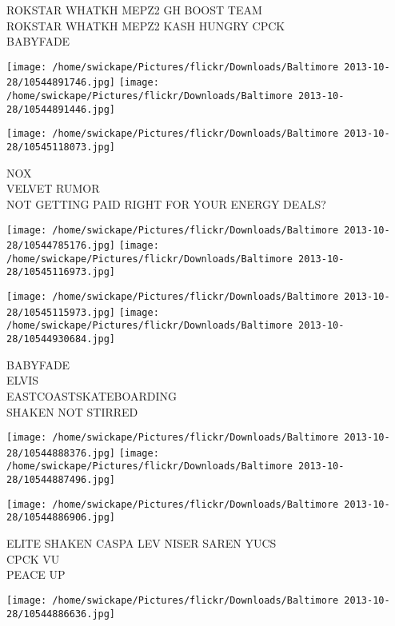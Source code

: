 \documentclass[10pt,letterpaper]{article}
\begin{document}
ROKSTAR WHATKH MEPZ2 GH BOOST TEAM\\
ROKSTAR WHATKH MEPZ2 KASH HUNGRY CPCK\\
BABYFADE\\
\pagebreak

\texttt{[image: /home/swickape/Pictures/flickr/Downloads/Baltimore 2013-10-28/10544891746.jpg]}
\texttt{[image: /home/swickape/Pictures/flickr/Downloads/Baltimore 2013-10-28/10544891446.jpg]}

\vspace{0.25in}
\texttt{[image: /home/swickape/Pictures/flickr/Downloads/Baltimore 2013-10-28/10545118073.jpg]}

NOX\\
VELVET RUMOR\\
NOT GETTING PAID RIGHT FOR YOUR ENERGY DEALS?\\
\pagebreak

\texttt{[image: /home/swickape/Pictures/flickr/Downloads/Baltimore 2013-10-28/10544785176.jpg]}
\texttt{[image: /home/swickape/Pictures/flickr/Downloads/Baltimore 2013-10-28/10545116973.jpg]}

\texttt{[image: /home/swickape/Pictures/flickr/Downloads/Baltimore 2013-10-28/10545115973.jpg]}
\texttt{[image: /home/swickape/Pictures/flickr/Downloads/Baltimore 2013-10-28/10544930684.jpg]}

BABYFADE\\
ELVIS\\
EASTCOASTSKATEBOARDING\\
SHAKEN NOT STIRRED\\
\pagebreak

\texttt{[image: /home/swickape/Pictures/flickr/Downloads/Baltimore 2013-10-28/10544888376.jpg]}
\texttt{[image: /home/swickape/Pictures/flickr/Downloads/Baltimore 2013-10-28/10544887496.jpg]}

\texttt{[image: /home/swickape/Pictures/flickr/Downloads/Baltimore 2013-10-28/10544886906.jpg]}

ELITE SHAKEN CASPA LEV NISER SAREN YUCS\\
CPCK VU\\
PEACE UP\\
\pagebreak

\texttt{[image: /home/swickape/Pictures/flickr/Downloads/Baltimore 2013-10-28/10544886636.jpg]}
\end{document}
